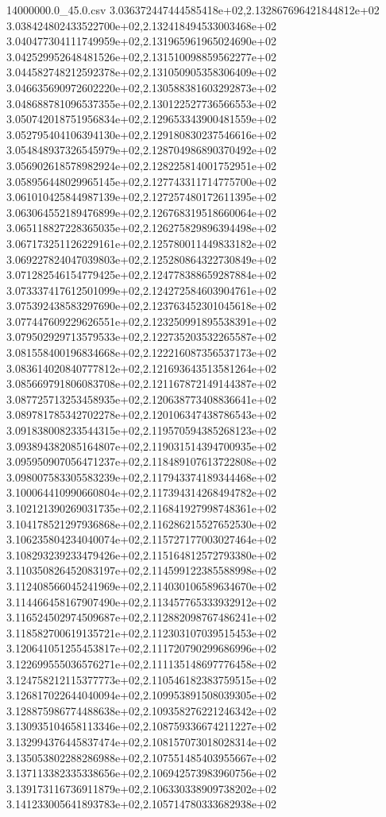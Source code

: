 \begin{filecontents*}{14000000.0_45.0.csv}
3.036372447444585418e+02,2.132867696421844812e+02
3.038424802433522700e+02,2.132418494533003468e+02
3.040477304111749959e+02,2.131965961965024690e+02
3.042529952648481526e+02,2.131510098859562277e+02
3.044582748212592378e+02,2.131050905358306409e+02
3.046635690972602220e+02,2.130588381603292873e+02
3.048688781096537355e+02,2.130122527736566553e+02
3.050742018751956834e+02,2.129653343900481559e+02
3.052795404106394130e+02,2.129180830237546616e+02
3.054848937326545979e+02,2.128704986890370492e+02
3.056902618578982924e+02,2.128225814001752951e+02
3.058956448029965145e+02,2.127743311714775700e+02
3.061010425844987139e+02,2.127257480172611395e+02
3.063064552189476899e+02,2.126768319518660064e+02
3.065118827228365035e+02,2.126275829896394498e+02
3.067173251126229161e+02,2.125780011449833182e+02
3.069227824047039803e+02,2.125280864322730849e+02
3.071282546154779425e+02,2.124778388659287884e+02
3.073337417612501099e+02,2.124272584603904761e+02
3.075392438583297690e+02,2.123763452301045618e+02
3.077447609229626551e+02,2.123250991895538391e+02
3.079502929713579533e+02,2.122735203532265587e+02
3.081558400196834668e+02,2.122216087356537173e+02
3.083614020840777812e+02,2.121693643513581264e+02
3.085669791806083708e+02,2.121167872149144387e+02
3.087725713253458935e+02,2.120638773408836641e+02
3.089781785342702278e+02,2.120106347438786543e+02
3.091838008233544315e+02,2.119570594385268123e+02
3.093894382085164807e+02,2.119031514394700935e+02
3.095950907056471237e+02,2.118489107613722808e+02
3.098007583305583239e+02,2.117943374189344468e+02
3.100064410990660804e+02,2.117394314268494782e+02
3.102121390269031735e+02,2.116841927998748361e+02
3.104178521297936868e+02,2.116286215527652530e+02
3.106235804234040074e+02,2.115727177003027464e+02
3.108293239233479426e+02,2.115164812572793380e+02
3.110350826452083197e+02,2.114599122385588998e+02
3.112408566045241969e+02,2.114030106589634670e+02
3.114466458167907490e+02,2.113457765333932912e+02
3.116524502974509687e+02,2.112882098767486241e+02
3.118582700619135721e+02,2.112303107039515453e+02
3.120641051255453817e+02,2.111720790299686996e+02
3.122699555036576271e+02,2.111135148697776458e+02
3.124758212115377773e+02,2.110546182383759515e+02
3.126817022644040094e+02,2.109953891508039305e+02
3.128875986774488638e+02,2.109358276221246342e+02
3.130935104658113346e+02,2.108759336674211227e+02
3.132994376445837474e+02,2.108157073018028314e+02
3.135053802288286988e+02,2.107551485403955667e+02
3.137113382335338656e+02,2.106942573983960756e+02
3.139173116736911879e+02,2.106330338909738202e+02
3.141233005641893783e+02,2.105714780333682938e+02

\end{filecontents*}
